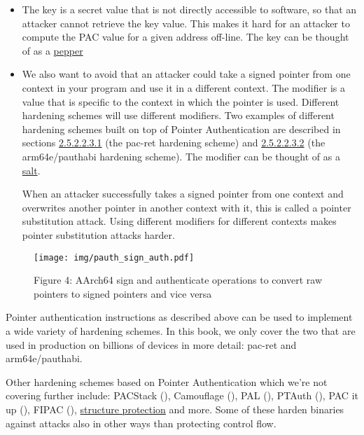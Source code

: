 \documentclass[
  a4paper,
]{report}
\begin{document}
\begin{itemize}
\item
  The key is a secret value that is not directly accessible to software,
  so that an attacker cannot retrieve the key value. This makes it hard
  for an attacker to compute the PAC value for a given address off-line.
  The key can be thought of as a
  \href{https://en.wikipedia.org/wiki/Pepper_(cryptography)}{pepper}
\item
  We also want to avoid that an attacker could take a signed pointer
  from one context in your program and use it in a different context.
  The modifier is a value that is specific to the context in which the
  pointer is used. Different hardening schemes will use different
  modifiers. Two examples of different hardening schemes built on top of
  Pointer Authentication are described in sections
  \hyperref[sec:pac-ret]{2.5.2.2.3.1} (the pac-ret hardening scheme) and
  \hyperref[sec:arm64e-pauthabi]{2.5.2.2.3.2} (the arm64e/pauthabi
  hardening scheme). The modifier can be thought of as a
  \href{https://en.wikipedia.org/wiki/Salt_(cryptography)}{salt}.

  When an attacker successfully takes a signed pointer from one context
  and overwrites another pointer in another context with it, this is
  called a pointer substitution
  attack. Using different modifiers
  for different contexts makes pointer substitution attacks harder.
\end{itemize}

\begin{figure}
\centering
\texttt{[image: img/pauth\_sign\_auth.pdf]}
\caption{Figure 4: AArch64 sign and authenticate operations to convert
raw pointers to signed pointers and vice
versa}\label{fig:pauth-sign-auth}
\end{figure}

Pointer authentication instructions as described above can be used to
implement a wide variety of hardening schemes. In this book, we only
cover the two that are used in production on billions of devices in more
detail: pac-ret and arm64e/pauthabi.

Other hardening schemes based on Pointer Authentication which we're not
covering further include: PACStack
(), Camouflage
(), PAL
(), PTAuth
(), PAC it up
(), FIPAC
(),
\href{https://discourse.llvm.org/t/rfc-structure-protection-a-family-of-uaf-mitigation-techniques/85555}{structure
protection} and more. Some of these harden binaries against attacks also
in other ways than protecting control flow.
\end{document}
